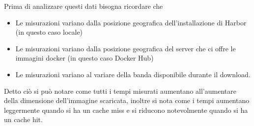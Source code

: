 \documentclass[12pt]{report}
\begin{document}
Prima di analizzare questi dati bisogna ricordare che
\begin{itemize}
    \item Le misurazioni variano dalla posizione geografica dell'installazione di Harbor (in questo caso locale)
    \item Le misurazioni variano dalla posizione geografica del server che ci offre le immagini docker (in questo caso Docker Hub)
    \item Le misurazioni variano al variare della banda disponibile durante il download.
\end{itemize}
Detto ciò si può notare come tutti i tempi misurati aumentano all'aumentare della dimensione dell'immagine scaricata, inoltre si nota come i tempi aumentano leggermente quando si ha un cache miss e si riducono notevolmente quando si ha un cache hit.

\printbibliography[heading=bibintoc, title={Bibliografia}]
\end{document}
